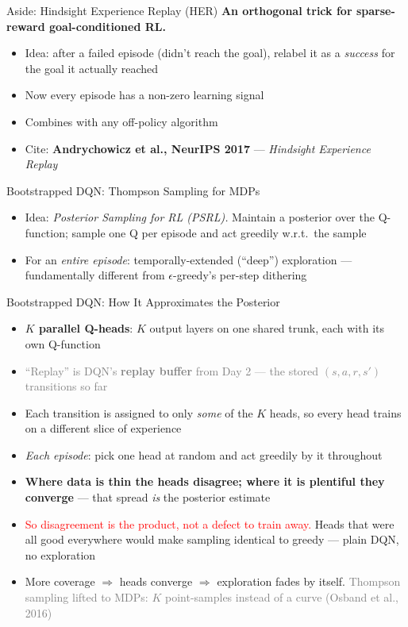 \begin{frame}{Aside: Hindsight Experience Replay (HER)}
\textbf{An orthogonal trick for sparse-reward goal-conditioned RL.}
\begin{itemize}
    \setlength{\itemsep}{0.55em}
    \item Idea: after a failed episode (didn't reach the goal), relabel it as a \emph{success} for the goal it actually reached
    \item Now every episode has a non-zero learning signal
    \item Combines with any off-policy algorithm
    \item Cite: \textbf{Andrychowicz et al., NeurIPS 2017} --- \emph{Hindsight Experience Replay}
\end{itemize}
\end{frame}

\begin{frame}{Bootstrapped DQN: Thompson Sampling for MDPs}
\begin{itemize}
    \setlength{\itemsep}{0.55em}
    \item Idea: \emph{Posterior Sampling for RL (PSRL).} Maintain a posterior over the Q-function; sample one Q per episode and act greedily w.r.t.\ the sample
    \item For an \emph{entire episode}: temporally-extended (``deep'') exploration --- fundamentally different from $\epsilon$-greedy's per-step dithering
\end{itemize}
\end{frame}

\begin{frame}{Bootstrapped DQN: How It Approximates the Posterior}
\begin{itemize}
    \setlength{\itemsep}{0.32em}
    \item \textbf{$K$ parallel Q-heads}: $K$ output layers on one shared trunk, each with its own Q-function
    \item \textcolor{gray}{``Replay'' is DQN's \textbf{replay buffer} from Day 2 --- the stored $(s,a,r,s')$ transitions so far}
    \item Each transition is assigned to only \emph{some} of the $K$ heads, so every head trains on a different slice of experience
    \item \emph{Each episode}: pick one head at random and act greedily by it throughout
    \item \textbf{Where data is thin the heads disagree; where it is plentiful they converge} --- that spread \emph{is} the posterior estimate
    \item \textcolor{red}{So disagreement is the product, not a defect to train away.} Heads that were all good everywhere would make sampling identical to greedy --- plain DQN, no exploration
    \item More coverage $\Rightarrow$ heads converge $\Rightarrow$ exploration fades by itself. \textcolor{gray}{Thompson sampling lifted to MDPs: $K$ point-samples instead of a curve (Osband et al., 2016)}
\end{itemize}
\end{frame}

